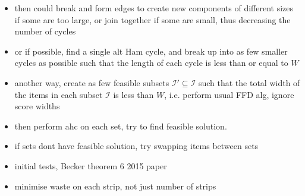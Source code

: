 \documentclass[oribibl]{llncs}
\begin{document}
\begin{itemize}
	\item then could break and form edges to create new components of different sizes if some are too large, or join together if some are small, thus decreasing the number of cycles
	\item or if possible, find a single alt Ham cycle, and break up into as few smaller cycles as possible such that the length of each cycle is less than or equal to $W$
	\item another way, create as few feasible subsets $\mathcal{I}' \subseteq \mathcal{I}$ such that the total width of the items in each subset $\mathcal{I}$ is less than $W$, i.e. perform usual FFD alg, ignore score widths
	\item then perform ahc on each set, try to find feasible solution.
	\item if sets dont have feasible solution, try swapping items between sets
	\item initial tests, Becker theorem 6 2015 paper \cite{garraffa2016}
	\item minimise waste on each strip, not just number of strips
\end{itemize}
\end{document}
